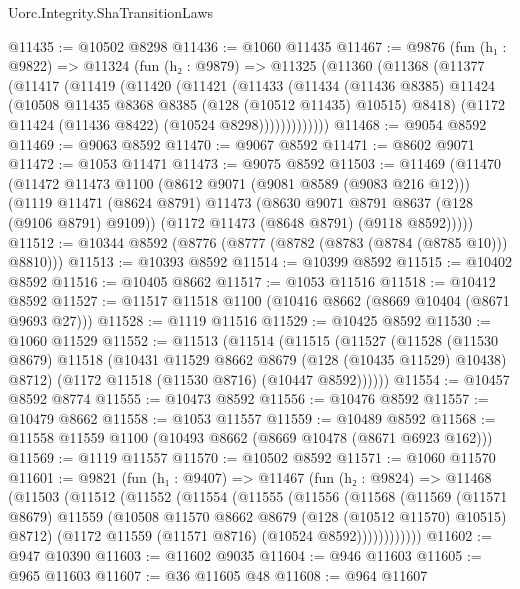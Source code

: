 \begin{lexlean}{Uorc.Integrity.ShaTransitionLaws}
\begin{coremodule}
@11435 := @10502 @8298
@11436 := @1060 @11435
@11467 := @9876
    (fun (h₁ : @9822) =>
    @11324
      (fun (h₂ : @9879) =>
      @11325
        (@11360
          (@11368
            (@11377
              (@11417
                (@11419
                  (@11420
                    (@11421
                      (@11433
                        (@11434
                          (@11436 @8385)
                          @11424
                          (@10508 @11435 @8368 @8385 (@128 (@10512 @11435) @10515) @8418)
                          (@1172 @11424 (@11436 @8422) (@10524 @8298)))))))))))))
@11468 := @9054 @8592
@11469 := @9063 @8592
@11470 := @9067 @8592
@11471 := @8602 @9071
@11472 := @1053 @11471
@11473 := @9075 @8592
@11503 := @11469
    (@11470
      (@11472
        @11473
        @1100
        (@8612 @9071 (@9081 @8589 (@9083 @216 @12)))
        (@1119
          @11471
          (@8624 @8791)
          @11473
          (@8630 @9071 @8791 @8637 (@128 (@9106 @8791) @9109))
          (@1172 @11473 (@8648 @8791) (@9118 @8592)))))
@11512 := @10344 @8592 (@8776 (@8777 (@8782 (@8783 (@8784 (@8785 @10))) @8810)))
@11513 := @10393 @8592
@11514 := @10399 @8592
@11515 := @10402 @8592
@11516 := @10405 @8662
@11517 := @1053 @11516
@11518 := @10412 @8592
@11527 := @11517 @11518 @1100 (@10416 @8662 (@8669 @10404 (@8671 @9693 @27)))
@11528 := @1119 @11516
@11529 := @10425 @8592
@11530 := @1060 @11529
@11552 := @11513
    (@11514
      (@11515
        (@11527
          (@11528
            (@11530 @8679)
            @11518
            (@10431 @11529 @8662 @8679 (@128 (@10435 @11529) @10438) @8712)
            (@1172 @11518 (@11530 @8716) (@10447 @8592))))))
@11554 := @10457 @8592 @8774
@11555 := @10473 @8592
@11556 := @10476 @8592
@11557 := @10479 @8662
@11558 := @1053 @11557
@11559 := @10489 @8592
@11568 := @11558 @11559 @1100 (@10493 @8662 (@8669 @10478 (@8671 @6923 @162)))
@11569 := @1119 @11557
@11570 := @10502 @8592
@11571 := @1060 @11570
@11601 := @9821
    (fun (h₁ : @9407) =>
    @11467
      (fun (h₂ : @9824) =>
      @11468
        (@11503
          (@11512
            (@11552
              (@11554
                (@11555
                  (@11556
                    (@11568
                      (@11569
                        (@11571 @8679)
                        @11559
                        (@10508 @11570 @8662 @8679 (@128 (@10512 @11570) @10515) @8712)
                        (@1172 @11559 (@11571 @8716) (@10524 @8592))))))))))))
@11602 := @947 @10390
@11603 := @11602 @9035
@11604 := @946 @11603
@11605 := @965 @11603
@11607 := @36 @11605 @48
@11608 := @964 @11607

\end{coremodule}
\end{lexlean}
